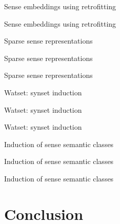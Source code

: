 \documentclass{beamer}
\begin{document}
\begin{frame}{Sense embeddings using retrofitting}
	
\end{frame}

\begin{frame}{Sense embeddings using retrofitting}
	
\end{frame}



\begin{frame}{Sparse sense representations}
	
\end{frame}


\begin{frame}{Sparse sense representations}
	
\end{frame}


\begin{frame}{Sparse sense representations}
	
\end{frame}

\begin{frame}{Watset: synset induction}
	
\end{frame}


\begin{frame}{Watset: synset induction}
	
\end{frame}


\begin{frame}{Watset: synset induction}
	
\end{frame}


\begin{frame}{Induction of sense semantic classes}
	
\end{frame}

\begin{frame}{Induction of sense semantic classes}
	
\end{frame}

\begin{frame}{Induction of sense semantic classes}
	
\end{frame}


\section{Conclusion}
\end{document}
